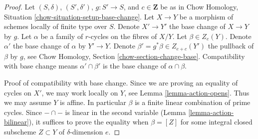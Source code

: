 \begin{proof}
Let $(S, \delta)$, $(S', \delta')$, $g : S' \to S$, and $c \in \mathbf{Z}$
be as in Chow Homology, Situation \ref{chow-situation-setup-base-change}.
Let $X \to Y$ be a morphism of schemes locally of finite type over $S$.
Denote $X' \to Y'$ the base change of $X \to Y$ by $g$.
Let $\alpha$ be a family of $r$-cycles on the fibres of $X/Y$.
Let $\beta \in Z_e(Y)$. Denote $\alpha'$ the
base change of $\alpha$ by $Y' \to Y$. Denote
$\beta' = g^*\beta \in Z_{e + c}(Y')$ the pullback of $\beta$ by $g$, see
Chow Homology, Section \ref{chow-section-change-base}.
Compatibility with base change means
$\alpha' \cap \beta'$ is the base change of $\alpha \cap \beta$.

\medskip\noindent
Proof of compatibility with base change.
Since we are proving an equality of cycles on $X'$, we may work locally
on $Y$, see Lemma \ref{lemma-action-opens}. Thus we may assume $Y$
is affine. In particular $\beta$ is a finite linear combination of prime
cycles. Since $- \cap -$ is linear in the second variable
(Lemma \ref{lemma-action-bilinear}), it suffices
to prove the equality when $\beta = [Z]$ for some integral closed subscheme
$Z \subset Y$ of $\delta$-dimension $e$.


\end{proof}

